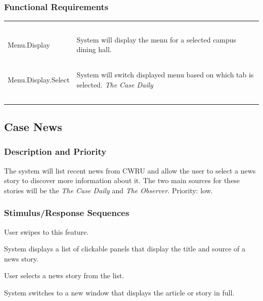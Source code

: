 \documentclass[pdftex,12pt,letter]{article}
\begin{document}
\subsubsection{Functional Requirements}
\begin{table}[!h]
\begin{tabularx}{\textwidth }[t]{|l Y|}
\hline
~&~\\
Menu.Display & System will display the menu for a selected campus dining hall.\\ 
~&~\\
Menu.Display.Select & System will switch displayed menu based on which tab is selected. \emph{The Case Daily}\\
~&~\\
\hline
\end{tabularx}
\end{table}
\FloatBarrier
\subsection{Case News}
\subsubsection{Description and Priority}
The system will list recent news from CWRU and allow the user to select a news story to discover more information about it. The two main sources for these stories will be the \emph{The Case Daily} and \emph{The Observer}. Priority: low.
\subsubsection{Stimulus/Response Sequences}
\begin{description}\itemsep1pt
\item[Stimulus:] User swipes to this feature.
\item[Response:] System displays a list of clickable panels that display the title and source of a news story.
\item[Stimulus:] User selects a news story from the list.
\item[Response:] System switches to a new window that displays the article or story in full.
\end{description}
\end{document}
